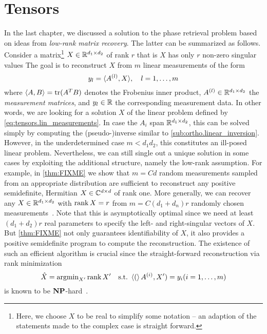 \chapter{Tensors}
\label{chap:tensors}

In the last chapter, we discussed a solution to the phase retrieval problem based on ideas from \emph{low-rank matrix recovery}.
The latter can be summarized as follows.
Consider a matrix\footnote{%
  Here, we choose $X$ to be real to simplify some notation -- an adaption of the statements made to the complex case is straight forward.
}
$X \in \mathbb{R}^{d_1 \times d_2}$ of rank $r$ that is $X$ has only $r$ non-zero singular values
The goal is to reconstruct $X$ from $m$ linear measurements of the form
\[
  y_l = {\braket{A^{(l)}, X}}, \quad l=1,\ldots,m
  \label{eq:tensors.lin_measurements}
\]
where $\braket{A, B} = \operatorname{tr} ({{A}^T} B)$ denotes the Frobenius inner product, $A^{(l)} \in \mathbb{R}^{d_1 \times d_2}$ the \emph{measurement matrices}, and $y_l \in \mathbb{R}$ the corresponding measurement data.
In other words, we are looking for a solution $X$ of the linear problem defined by \cref{eq:tensors.lin_measurements}.
In case the $A_i$ span $\mathbb{R}^{d_1 \times d_2}$, this can be solved simply by computing the (pseudo-)inverse similar to \cref{sub:ortho.linear_inversion}.
However, in the underdetermined case $m < d_1 d_2$, this constitutes an ill-posed linear problem.
Nevertheless, we can still single out a unique solution in some cases by exploiting the additional structure, namely the low-rank assumption.
For example, in \cref{thm:FIXME} we show that $m = C d$ random measurements sampled from an appropriate distribution are sufficient to reconstruct any positive semidefinite, Hermitian $X \in \mathbb{C}^{d \times d}$ of rank one.
More generally, we can recover any $X \in \mathbb{R}^{d_1 \times d_2}$ with $\operatorname{rank} X = r$ from $m = C (d_1 + d_n) r$ randomly chosen measurements~\cite{FIXME}.
Note that this is asymptotically optimal since we need at least $(d_1 + d_2) r$ real parameters to specify the left- and right-singular vectors of $X$.
But \cref{thm:FIXME} not only guarantees identifiability of $X$, it also provides a positive semidefinite program to compute the reconstruction.
The existence of such an efficient algorithm is crucial since the straight-forward reconstruction via rank minimization
\[
  \hat{X} = \operatorname{argmin}_{X'} \operatorname{rank} X' \quad\mathrm{s.t.}\ \braket(A^{(i)}, X') = y_i (i = 1, \ldots, m)
\]
is known to be $\mathbf{NP}$-hard~\cite{FIXME}.


